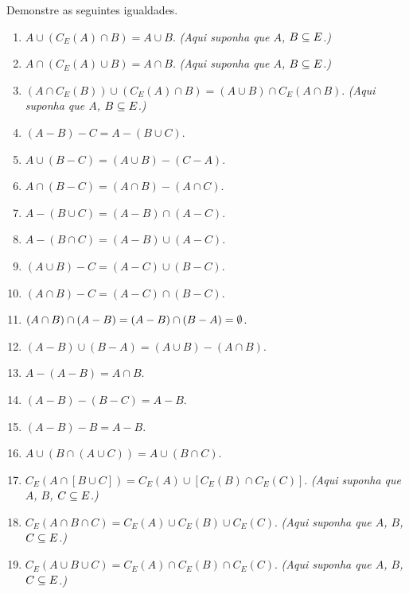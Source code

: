 \documentclass[12pt]{exam}
\begin{document}
\vspace{.3cm}

\questao{} Demonstre as seguintes igualdades.
\begin{enumerate}[label={\alph*})]
\item $A \cup (C_E(A) \cap B) = A \cup B$. \textit{(Aqui suponha que $A$, $B \subseteq E$.)}

\item $A \cap (C_E(A) \cup B) = A \cap B$. \textit{(Aqui suponha que $A$, $B \subseteq E$.)}

\item $(A \cap C_E(B)) \cup (C_E(A) \cap B) = (A \cup B) \cap C_E(A \cap B)$. \textit{(Aqui suponha que $A$, $B \subseteq E$.)}
\item $(A - B) - C = A - (B \cup C)$.

\item $A \cup (B - C) = (A \cup B) - (C - A)$.

\item $A \cap (B - C) = (A \cap B) - (A \cap C)$.

\item $A - (B \cup C) = (A - B) \cap (A - C)$.

\item $A - (B \cap C) = (A - B) \cup (A - C)$.

\item $(A \cup B) - C = (A - C) \cup (B - C)$.

\item $(A \cap B) - C = (A - C) \cap (B - C)$.

\item $(A \cap B) \cap (A - B) = (A - B) \cap (B - A) = \emptyset$.

\item $(A - B) \cup (B - A) = (A \cup B) - (A \cap B)$.

\item $A - (A - B) = A \cap B$.

\item $(A - B) - (B - C) = A - B$.

\item $(A - B) - B = A - B$.

\item $A \cup (B \cap (A \cup C)) = A \cup (B \cap C)$.

\item $C_E( A \cap [B \cup C]) = C_E(A) \cup [C_E(B)\cap C_E(C)]$. \textit{(Aqui suponha que $A$, $B$, $C \subseteq E$.)}

\item $C_E( A \cap B \cap C) = C_E(A) \cup C_E(B) \cup C_E(C)$. \textit{(Aqui suponha que $A$, $B$, $C \subseteq E$.)}

\item $C_E( A \cup B \cup C) = C_E(A) \cap C_E(B) \cap C_E(C)$. \textit{(Aqui suponha que $A$, $B$, $C \subseteq E$.)}
\end{enumerate}
\end{document}

